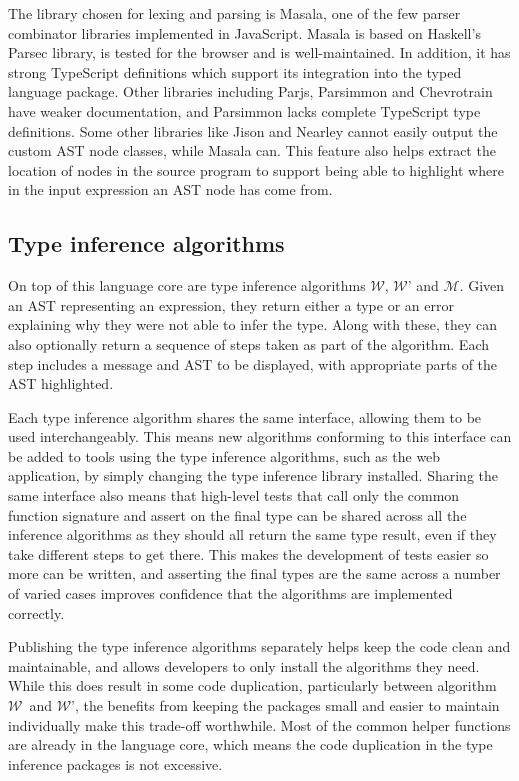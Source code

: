 \documentclass[a4paper,fleqn,oneside,12pt]{report}
\newcommand{\W}{$\mathcal{W}$}
\newcommand{\M}{$\mathcal{M}$}
\begin{document}
The library chosen for lexing and parsing is Masala, one of the few parser combinator libraries implemented in JavaScript. Masala is based on Haskell’s Parsec library, is tested for the browser and is well-maintained. In addition, it has strong TypeScript definitions which support its integration into the typed language package. Other libraries including Parjs, Parsimmon and Chevrotrain have weaker documentation, and Parsimmon lacks complete TypeScript type definitions. Some other libraries like Jison and Nearley cannot easily output the custom AST node classes, while Masala can. This feature also helps extract the location of nodes in the source program to support being able to highlight where in the input expression an AST node has come from.

\subsection{Type inference algorithms}\label{id:h.75leuokwbltp}

On top of this language core are type inference algorithms \W, \W' and \M. Given an AST representing an expression, they return either a type or an error explaining why they were not able to infer the type. Along with these, they can also optionally return a sequence of steps taken as part of the algorithm. Each step includes a message and AST to be displayed, with appropriate parts of the AST highlighted.

Each type inference algorithm shares the same interface, allowing them to be used interchangeably. This means new algorithms conforming to this interface can be added to tools using the type inference algorithms, such as the web application, by simply changing the type inference library installed. Sharing the same interface also means that high-level tests that call only the common function signature and assert on the final type can be shared across all the inference algorithms as they should all return the same type result, even if they take different steps to get there. This makes the development of tests easier so more can be written, and asserting the final types are the same across a number of varied cases improves confidence that the algorithms are implemented correctly.

Publishing the type inference algorithms separately helps keep the code clean and maintainable, and allows developers to only install the algorithms they need. While this does result in some code duplication, particularly between algorithm \W\ and \W', the benefits from keeping the packages small and easier to maintain individually make this trade-off worthwhile. Most of the common helper functions are already in the language core, which means the code duplication in the type inference packages is not excessive.
\end{document}
